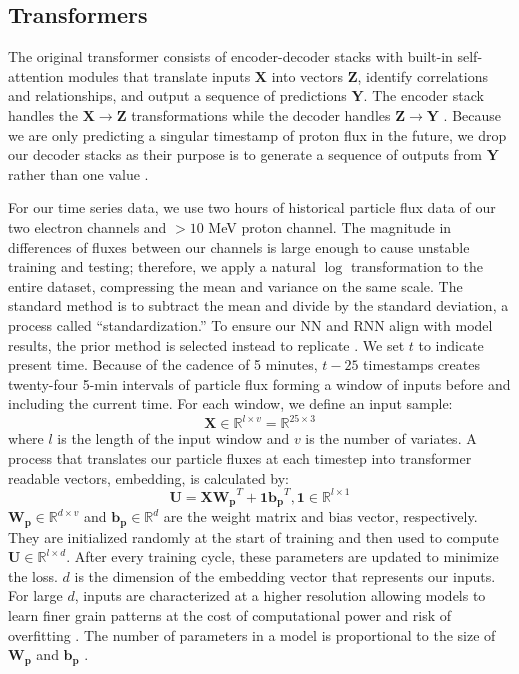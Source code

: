 \subsection{Transformers}
\label{sec:transformer}

The original transformer consists of encoder-decoder stacks with built-in self-attention modules that translate inputs $\mathbf{X}$ into vectors $\mathbf{Z}$,
identify correlations and relationships, and output a sequence of predictions $\mathbf{Y}$. The encoder stack handles the $\mathbf{X \rightarrow Z}$ transformations while the decoder  handles $\mathbf{Z \rightarrow Y}$ \cite{vaswani2017attention}.
Because we are only predicting a singular timestamp of proton flux in the future, we drop our decoder stacks as their purpose is to generate a sequence of 
outputs from $\mathbf{Y}$ rather than one value \cite{vaswani2017attention,devlin2019bert}.

For our time series data, we use two hours of historical particle flux data of our two electron channels and $>10$ MeV proton channel. The magnitude in differences of fluxes between our channels  is large enough to cause 
unstable training and testing; therefore, we apply a natural $\log$ transformation to the entire dataset, compressing the mean and  variance on the same scale. The standard method is to 
subtract the mean and divide by the standard deviation, a process called ``standardization.'' To ensure our NN and RNN
align with  model results, the prior method is selected instead to replicate .
We set $t$ to indicate present time. Because of the cadence of 5 minutes,
 $t - 25$ timestamps creates twenty-four 5-min intervals of particle flux forming a window of inputs before and including the current time. For each window, we define an input sample:
$$
\mathbf{X} \in \mathbb{R}^{l \times v} = \mathbb{R}^{25 \times 3}
$$
where $l$ is the length of the input window and $v$ is the number of variates. A process that translates our particle fluxes at each timestep into transformer
readable vectors, embedding, is calculated by:
$$
\mathbf{
U} = \mathbf{XW_p}^T + \mathbf{1b_p}^T, \mathbf{1} \in \mathbb{R}^{l \times 1}
$$
$\mathbf{W_p} \in \mathbb{R}^{d \times v}$ and $\mathbf{b_p} \in \mathbb{R}^{d}$ are the weight matrix and bias vector, respectively. They are initialized randomly at the start of training and then used to compute $\mathbf{U} \in \mathbb{R}^{l \times d}$.
After every training cycle, these parameters are updated to minimize the loss.
$d$  is the dimension of the embedding vector that represents our inputs. For large $d$, inputs are characterized at a higher resolution allowing  models to learn finer grain patterns at the cost of computational power and risk of overfitting \cite{zhao2026transformersurvey}. 
The number of parameters in a model is proportional to the size of $\mathbf{W_p}$ and $\mathbf{b_p}$ \cite{vaswani2017attention,zerveas2020transformer}.

